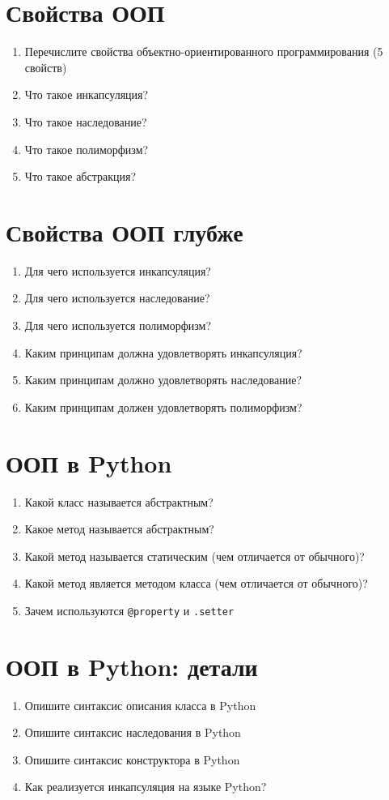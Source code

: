 \documentclass[12pt]{article}
\begin{document}
\section*{Свойства ООП}
\begin{enumerate}
  \item Перечислите свойства объектно-ориентированного программирования (5 свойств)
  \item Что такое инкапсуляция?
  \item Что такое наследование?
  \item Что такое полиморфизм?
  \item Что такое абстракция?
\end{enumerate}

\section*{Свойства ООП глубже}
\begin{enumerate}
  \item Для чего используется инкапсуляция?
  \item Для чего используется наследование?
  \item Для чего используется полиморфизм?
  \item Каким принципам должна удовлетворять инкапсуляция?
  \item Каким принципам должно удовлетворять наследование?
  \item Каким принципам должен удовлетворять полиморфизм?
\end{enumerate}

\section*{ООП в Python}
\begin{enumerate}
  \item Какой класс называется абстрактным?
  \item Какое метод называется абстрактным?
  \item Какой метод называется статическим (чем отличается от обычного)?
  \item Какой метод является методом класса (чем отличается от обычного)?
  \item Зачем используются \verb|@property| и \verb|.setter|
\end{enumerate}

\section*{ООП в Python: детали}
\begin{enumerate}
  \item Опишите синтаксис описания класса в Python
  \item Опишите синтаксис наследования в Python
  \item Опишите синтаксис конструктора в Python
  \item Как реализуется инкапсуляция на языке Python?
\end{enumerate}
\end{document}
